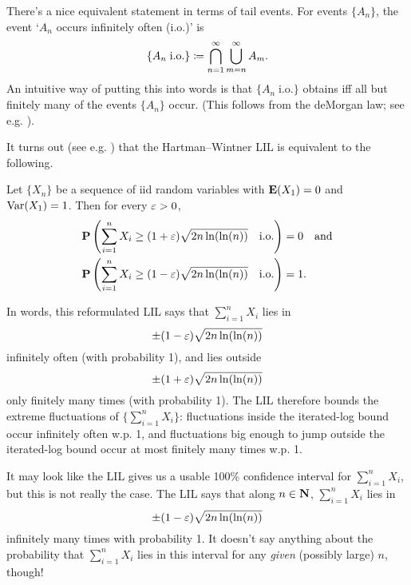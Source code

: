 \documentclass[11pt,letterpaper,reqno,oneside]{article}
\begin{document}
There's a nice equivalent statement in terms of tail events. For events $\{ A_n \}$, the event `$A_n$ occurs infinitely often (i.o.)' is
%
\begin{equation*}
	\{ A_n \;\text{i.o.} \}
	\coloneqq \bigcap_{n=1}^\infty \bigcup_{m=n}^\infty A_m .
\end{equation*}
%
An intuitive way of putting this into words is that $\{ A_n \;\text{i.o.} \}$ obtains iff all but finitely many of the events $\{ A_n \}$ occur. (This follows from the deMorgan law; see e.g. \textcite[][sec. 3.4]{Rosenthal2006}).

It turns out (see e.g. \textcite[][pp. 154--6]{Billingsley1995}) that the Hartman--Wintner LIL is equivalent to the following.
%
\begin{corollary}
	Let $\{ X_n \}$ be a sequence of iid random variables with $\mathbf{E}(X_1)=0$ and $\mathrm{Var}(X_1)=1$. Then for every $\varepsilon>0$,
	\begin{align*}
		\mathbf{P}\left( \sum_{i=1}^n X_i 
		\geq (1+\varepsilon) \sqrt{2 n \ln (\ln (n) ) } \quad\text{i.o.} \right) ={}& 0
		\quad\text{and}
		\\
		\mathbf{P}\left( \sum_{i=1}^n X_i 
		\geq (1-\varepsilon) \sqrt{2 n \ln (\ln (n) ) } \quad\text{i.o.} \right) ={}& 1 .
	\end{align*}
\end{corollary}
%
In words, this reformulated LIL says that $\sum_{i=1}^n X_i$ lies in
%
\begin{equation*}
	\pm (1-\varepsilon) \sqrt{2 n \ln (\ln (n) ) }
\end{equation*}
%
infinitely often (with probability 1), and lies outside
%
\begin{equation*}
	\pm (1+\varepsilon) \sqrt{2 n \ln (\ln (n) ) }
\end{equation*}
%
only finitely many times (with probability 1). The LIL therefore bounds the extreme fluctuations of $\bigl\{ \sum_{i=1}^n X_i \bigr\}$: fluctuations inside the iterated-log bound occur infinitely often w.p. 1, and fluctuations big enough to jump outside the iterated-log bound occur at most finitely many times w.p. 1.

It may look like the LIL gives us a usable 100\% confidence interval for $\sum_{i=1}^n X_i$, but this is not really the case. The LIL says that along $n \in \mathbf{N}$, $\sum_{i=1}^n X_i$ lies in
%
\begin{equation*}
	\pm (1-\varepsilon) \sqrt{2 n \ln (\ln (n) ) }
\end{equation*}
%
infinitely many times with probability 1. It doesn't say anything about the probability that $\sum_{i=1}^n X_i$ lies in this interval for any \emph{given} (possibly large) $n$, though!
\end{document}
